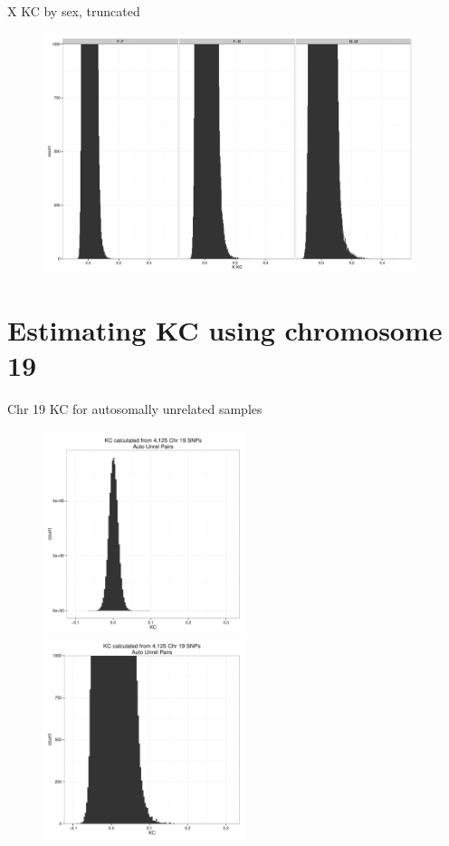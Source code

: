 \documentclass{beamer}
\begin{document}
\begin{frame}{X KC by sex, truncated}
\begin{figure}
\includegraphics[height=7cm]{../olga_update_27july2015/xkc_unrel_hist_bySexPair_trunc.pdf}
\end{figure}
\end{frame}

\section[]{Estimating KC using chromosome 19}
\begin{frame}{Chr 19 KC for autosomally unrelated samples}
\begin{figure}
\includegraphics[height=5.9cm]{../olga_update_27july2015/kc_chr19_autounrel_hist.pdf}
\includegraphics[height=5.9cm]{../olga_update_27july2015/kc_chr19_autounrel_hist_trunc.pdf}
\end{figure}
\end{frame}
\end{document}
